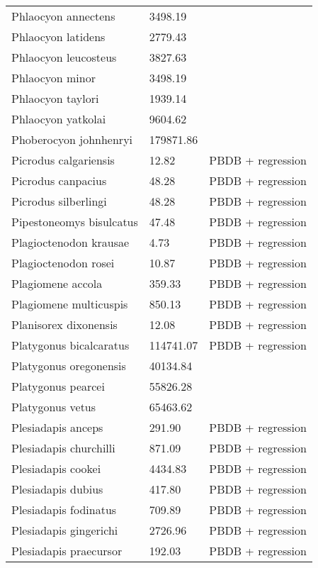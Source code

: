 \documentclass{article}
\begin{document}
\begin{center}
\begin{longtable}{p{} p{} p{}}
    Phlaocyon annectens & 3498.19 & \cite{Tomiya2013} \\ 
    Phlaocyon latidens & 2779.43 & \cite{Tomiya2013} \\ 
    Phlaocyon leucosteus & 3827.63 & \cite{Tomiya2013} \\ 
    Phlaocyon minor & 3498.19 & \cite{Tomiya2013} \\ 
    Phlaocyon taylori & 1939.14 & \cite{Tomiya2013} \\ 
    Phlaocyon yatkolai & 9604.62 & \cite{Tomiya2013} \\ 
    Phoberocyon johnhenryi & 179871.86 & \cite{Tomiya2013} \\ 
    Picrodus calgariensis & 12.82 & PBDB + regression \\ 
    Picrodus canpacius & 48.28 & PBDB + regression \\ 
    Picrodus silberlingi & 48.28 & PBDB + regression \\ 
    Pipestoneomys bisulcatus & 47.48 & PBDB + regression \\ 
    Plagioctenodon krausae & 4.73 & PBDB + regression \\ 
    Plagioctenodon rosei & 10.87 & PBDB + regression \\ 
    Plagiomene accola & 359.33 & PBDB + regression \\ 
    Plagiomene multicuspis & 850.13 & PBDB + regression \\ 
    Planisorex dixonensis & 12.08 & PBDB + regression \\ 
    Platygonus bicalcaratus & 114741.07 & PBDB + regression \\ 
    Platygonus oregonensis & 40134.84 & \cite{Tomiya2013} \\ 
    Platygonus pearcei & 55826.28 & \cite{Tomiya2013} \\ 
    Platygonus vetus & 65463.62 & \cite{Brook2004a} \\ 
    Plesiadapis anceps & 291.90 & PBDB + regression \\ 
    Plesiadapis churchilli & 871.09 & PBDB + regression \\ 
    Plesiadapis cookei & 4434.83 & PBDB + regression \\ 
    Plesiadapis dubius & 417.80 & PBDB + regression \\ 
    Plesiadapis fodinatus & 709.89 & PBDB + regression \\ 
    Plesiadapis gingerichi & 2726.96 & PBDB + regression \\ 
    Plesiadapis praecursor & 192.03 & PBDB + regression \\ 

\end{longtable}
\end{center}
\end{document}
